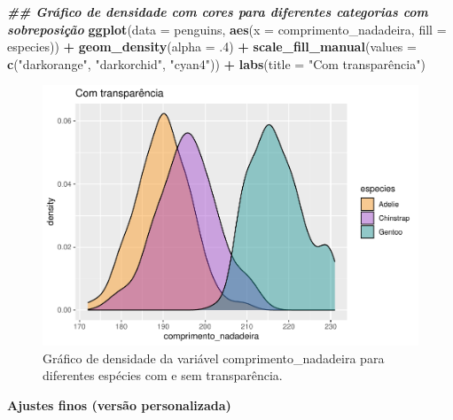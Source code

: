\documentclass[
]{article}
\newenvironment{Shaded}{\begin{snugshade}}{\end{snugshade}}
\newcommand{\AttributeTok}[1]{\textcolor[rgb]{0.13,0.29,0.53}{#1}}
\newcommand{\DecValTok}[1]{\textcolor[rgb]{0.00,0.00,0.81}{#1}}
\newcommand{\DocumentationTok}[1]{\textcolor[rgb]{0.56,0.35,0.01}{\textbf{\textit{#1}}}}
\newcommand{\FunctionTok}[1]{\textcolor[rgb]{0.13,0.29,0.53}{\textbf{#1}}}
\newcommand{\NormalTok}[1]{#1}
\newcommand{\SpecialCharTok}[1]{\textcolor[rgb]{0.81,0.36,0.00}{\textbf{#1}}}
\newcommand{\StringTok}[1]{\textcolor[rgb]{0.31,0.60,0.02}{#1}}
\begin{document}
\begin{Shaded}
\begin{Highlighting}[]
\DocumentationTok{\#\# Gráfico de densidade com cores para diferentes categorias com sobreposição}
\FunctionTok{ggplot}\NormalTok{(}\AttributeTok{data =}\NormalTok{ penguins, }\FunctionTok{aes}\NormalTok{(}\AttributeTok{x =}\NormalTok{ comprimento\_nadadeira, }\AttributeTok{fill =}\NormalTok{ especies)) }\SpecialCharTok{+}
    \FunctionTok{geom\_density}\NormalTok{(}\AttributeTok{alpha =}\NormalTok{ .}\DecValTok{4}\NormalTok{) }\SpecialCharTok{+}
    \FunctionTok{scale\_fill\_manual}\NormalTok{(}\AttributeTok{values =} \FunctionTok{c}\NormalTok{(}\StringTok{"darkorange"}\NormalTok{, }\StringTok{"darkorchid"}\NormalTok{, }\StringTok{"cyan4"}\NormalTok{)) }\SpecialCharTok{+}
    \FunctionTok{labs}\NormalTok{(}\AttributeTok{title =} \StringTok{"Com transparência"}\NormalTok{)}
\end{Highlighting}
\end{Shaded}

\begin{figure}
\includegraphics[width=0.75\linewidth,height=0.75\textheight]{epr_files/figure-latex/fig-dens-flipper-cat-2} \caption{Gráfico de densidade da variável comprimento_nadadeira para diferentes espécies com e sem transparência.}\label{fig:fig-dens-flipper-cat-2}
\end{figure}

\textbf{Ajustes finos (versão personalizada)}
\end{document}
